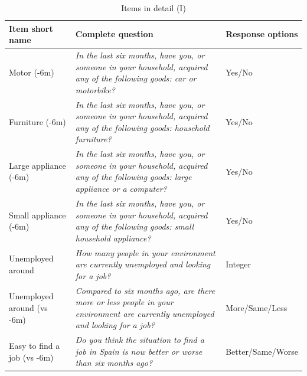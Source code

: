 \documentclass[12pt]{article}
\begin{document}
\begin{table}[]
  \caption{Items in detail (I)} 
  \label{item_table_1} 

 \begin{tabular}{  | p{5cm} | p{5cm} | p{5cm} |}
\hline
\multicolumn{1}{|l|}{Item short name}       & \multicolumn{1}{p{8cm}|}{Complete question}                                                                                                                   & \multicolumn{1}{p{3.5cm}|}{Response options} \\ \hline \hline
\multicolumn{1}{|p{4cm}|}{Motor (-6m)}           & \multicolumn{1}{p{8cm}|}{\emph{In the last six months, have you, or someone in your household, acquired any of the following goods: car or motorbike?}}              & \multicolumn{1}{p{3cm}|}{Yes/No}           \\ \hline
\multicolumn{1}{|p{4cm}|}{Furniture (-6m)}       & \multicolumn{1}{p{8cm}|}{\emph{In the last six months, have you, or someone in your household, acquired any of the following goods: household furniture?}}               & \multicolumn{1}{p{3cm}|}{Yes/No}           \\ \hline
\multicolumn{1}{|p{4cm}|}{Large appliance (-6m)} & \multicolumn{1}{p{8cm}|}{\emph{In the last six months, have you, or someone in your household, acquired any of the following goods: large appliance or a computer?}} & \multicolumn{1}{p{3cm}|}{Yes/No}           \\ \hline
\multicolumn{1}{|p{4cm}|}{Small appliance (-6m)}       & \multicolumn{1}{p{8cm}|}{\emph{In the last six months, have you, or someone in your household, acquired any of the following goods: small household appliance?}}               & \multicolumn{1}{p{3cm}|}{Yes/No}           \\ \hline
\multicolumn{1}{|p{4cm}|}{Unemployed  around}       & \multicolumn{1}{p{8cm}|}{\emph{How many people in your environment are currently unemployed and looking for a job?}}               & \multicolumn{1}{p{3cm}|}{Integer}           \\ \hline
\multicolumn{1}{|p{4cm}|}{Unemployed around (vs -6m)}       & \multicolumn{1}{p{8cm}|}{\emph{Compared to six months ago, are there more or less people in your environment are currently unemployed and looking for a job?}}  & \multicolumn{1}{p{3cm}|}{More/Same/Less}           \\ \hline
\multicolumn{1}{|p{4cm}|}{Easy to find a job  (vs -6m)}       & \multicolumn{1}{p{8cm}|}{\emph{Do you think the situation to find a job in Spain is now better or worse than six months ago?}}  & \multicolumn{1}{p{3cm}|}{Better/Same/Worse}           \\ \hline

\end{tabular}
\end{table}
\end{document}

